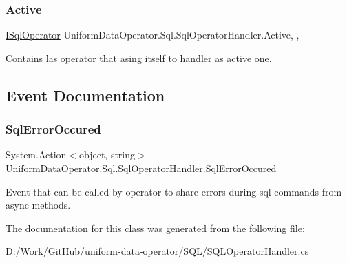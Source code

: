 \subsubsection{\texorpdfstring{Active}{Active}}
{\footnotesize\ttfamily \mbox{\hyperlink{interface_uniform_data_operator_1_1_sql_1_1_i_sql_operator}{I\+Sql\+Operator}} Uniform\+Data\+Operator.\+Sql.\+Sql\+Operator\+Handler.\+Active\hspace{0.3cm}{\ttfamily [static]}, {\ttfamily [get]}, {\ttfamily [set]}}



Contains las operator that asing itself to handler as active one. 



\subsection{Event Documentation}
\mbox{\label{class_uniform_data_operator_1_1_sql_1_1_sql_operator_handler_ab6cf915e80cf89b3e6eb14bf48a19185}} 
\subsubsection{\texorpdfstring{Sql\+Error\+Occured}{SqlErrorOccured}}
{\footnotesize\ttfamily System.\+Action$<$object, string$>$ Uniform\+Data\+Operator.\+Sql.\+Sql\+Operator\+Handler.\+Sql\+Error\+Occured\hspace{0.3cm}{\ttfamily [static]}}



Event that can be called by operator to share errors during sql commands from async methods. 



The documentation for this class was generated from the following file\+:\begin{DoxyCompactItemize}
\item 
D\+:/\+Work/\+Git\+Hub/uniform-\/data-\/operator/\+S\+Q\+L/S\+Q\+L\+Operator\+Handler.\+cs\end{DoxyCompactItemize}
